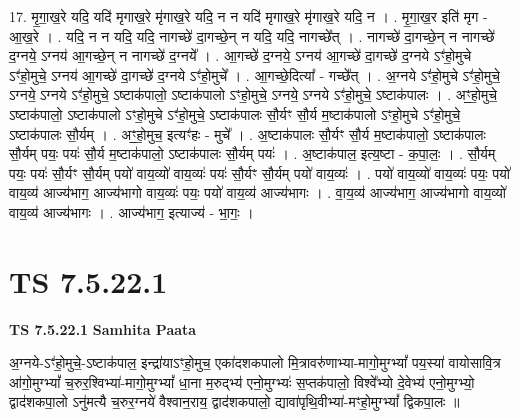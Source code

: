 \documentclass[17pt]{extarticle}
\begin{document}
17. मृ॒गा॒ख॒रे यदि॒ यदि॑ मृगाख॒रे मृ॑गाख॒रे यदि॒ न न यदि॑ मृगाख॒रे मृ॑गाख॒रे यदि॒ न । . मृ॒गा॒ख॒र इति॑ मृग - आ॒ख॒रे । . यदि॒ न न यदि॒ यदि॒ नागच्छे॑ दा॒गच्छे॒न् न यदि॒ यदि॒ नागच्छे᳚त् । . नागच्छे॑ दा॒गच्छे॒न् न नागच्छे॑ द॒ग्नये॒ ऽग्नय॑ आ॒गच्छे॒न् न नागच्छे॑ द॒ग्नये᳚ । . आ॒गच्छे॑ द॒ग्नये॒ ऽग्नय॑ आ॒गच्छे॑ दा॒गच्छे॑ द॒ग्नये ऽꣳ॑हो॒मुचे ऽꣳ॑हो॒मुचे॒ ऽग्नय॑ आ॒गच्छे॑ दा॒गच्छे॑ द॒ग्नये ऽꣳ॑हो॒मुचे᳚ । . आ॒गच्छे॒दित्या᳚ - गच्छे᳚त् । . अ॒ग्नये ऽꣳ॑हो॒मुचे ऽꣳ॑हो॒मुचे॒ ऽग्नये॒ ऽग्नये ऽꣳ॑हो॒मुचे॒ ऽष्टाक॑पालो॒ ऽष्टाक॑पालो ऽꣳहो॒मुचे॒ ऽग्नये॒ ऽग्नये ऽꣳ॑हो॒मुचे॒ ऽष्टाक॑पालः । . अꣳ॒॒हो॒मुचे॒ ऽष्टाक॑पालो॒ ऽष्टाक॑पालो ऽꣳहो॒मुचे ऽꣳ॑हो॒मुचे॒ ऽष्टाक॑पालः सौ॒र्यꣳ सौ॒र्य म॒ष्टाक॑पालो ऽꣳहो॒मुचे ऽꣳ॑हो॒मुचे॒ ऽष्टाक॑पालः सौ॒र्यम् । . अꣳ॒॒हो॒मुच॒ इत्यꣳ॑हः - मुचे᳚ । . अ॒ष्टाक॑पालः सौ॒र्यꣳ सौ॒र्य म॒ष्टाक॑पालो॒ ऽष्टाक॑पालः सौ॒र्यम् पयः॒ पयः॑ सौ॒र्य म॒ष्टाक॑पालो॒ ऽष्टाक॑पालः सौ॒र्यम् पयः॑ । . अ॒ष्टाक॑पाल॒ इत्य॒ष्टा - क॒पा॒लः॒ । . सौ॒र्यम् पयः॒ पयः॑ सौ॒र्यꣳ सौ॒र्यम् पयो॑ वाय॒व्यो॑ वाय॒व्यः॑ पयः॑ सौ॒र्यꣳ सौ॒र्यम् पयो॑ वाय॒व्यः॑ । . पयो॑ वाय॒व्यो॑ वाय॒व्यः॑ पयः॒ पयो॑ वाय॒व्य॑ आज्य॑भाग॒ आज्य॑भागो वाय॒व्यः॑ पयः॒ पयो॑ वाय॒व्य॑ आज्य॑भागः । . वा॒य॒व्य॑ आज्य॑भाग॒ आज्य॑भागो वाय॒व्यो॑ वाय॒व्य॑ आज्य॑भागः । . आज्य॑भाग॒ इत्याज्य॑ - भा॒गः॒ । \newline
\pagebreak
{}

\section{ TS 7.5.22.1 }

\textbf{TS 7.5.22.1 } \newline
\textbf{Samhita Paata} \newline

अ॒ग्नये-ऽꣳ॑हो॒मुचे॒-ऽष्टाक॑पाल॒ इन्द्रा॑याऽꣳहो॒मुच॒ एका॑दशकपालो मि॒त्रावरु॑णाभ्या-मागो॒मुग्भ्यां᳚ पय॒स्या॑ वायोसावि॒त्र आ॑गो॒मुग्भ्यां᳚ च॒रुर॒श्विभ्या॑-मागो॒मुग्भ्यां᳚ धा॒ना म॒रुद्भ्य॑ एनो॒मुग्भ्यः॑ स॒प्तक॑पालो॒ विश्वे᳚भ्यो दे॒वेभ्य॑ एनो॒मुग्भ्यो॒ द्वाद॑शकपा॒लो ऽनु॑मत्यै च॒रुर॒ग्नये॑ वैश्वान॒राय॒ द्वाद॑शकपालो॒ द्यावा॑पृथि॒वीभ्या॑-मꣳहो॒मुग्भ्यां᳚ द्विकपा॒लः ॥ \newline
\end{document}

